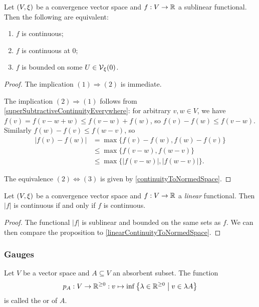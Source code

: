 \begin{proposition} \label{sublinearContinuity}
Let $\left( V,\xi \right)$ be a convergence vector space and $f: V\to \mathbb{R}$ a sublinear functional. Then the following are equivalent:
\begin{enumerate}
\item $f$ is continuous;
\item $f$ is continuous at $0$;
\item $f$ is bounded on some $U\in\operatorname{\mathcal{V}}_\xi(0)$.
\end{enumerate}
\end{proposition}
\begin{proof}
The implication $(1) \Rightarrow (2)$ is immediate. 

The implication $(2) \Rightarrow (1)$ follows from \ref{superSubtractiveContinuityEverywhere}: 
for arbitrary $v,w\in V$, we have $f(v) = f(v-w+w) \leq f(v-w) + f(w)$, so $f(v) - f(w) \leq f(v-w)$. Similarly $f(w) - f(v) \leq f(w-v)$, so
\begin{align*}
|f(v) - f(w)| &= \max\{f(v) - f(w), f(w) - f(v)\} \\
&\leq \max\{f(v-w), f(w-v)\} \\
&\leq \max\{|f(v-w)|, |f(w-v)|\}.
\end{align*}

The equivalence $(2) \Leftrightarrow (3)$ is given by \ref{continuityToNormedSpace}.
\end{proof}
\begin{corollary} \label{continuityAbsFunctional}
Let $\left( V,\xi \right)$ be a convergence vector space and $f: V\to \mathbb{R}$ a \emph{linear} functional. Then $|f|$ is continuous \textup{if and only if} $f$ is continuous.
\end{corollary}
\begin{proof}
The functional $|f|$ is sublinear and bounded on the same sets as $f$. We can then compare the proposition to \ref{linearContinuityToNormedSpace}.
\end{proof}

\subsubsection{Gauges}
\begin{definition}
Let $V$ be a vector space and $A\subseteq V$ an absorbent subset. The function
\[ p_A: V\to \mathbb{R}^{\geq 0}: v\mapsto \inf\left\{ \lambda\in \mathbb{R}^{\geq 0} \;\middle|\; v\in \lambda A \right\} \]
is called the  or  of $A$.
\end{definition}

